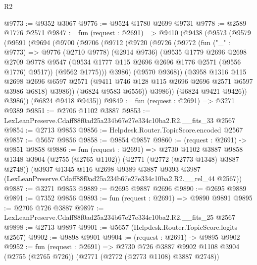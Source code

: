 \begin{lexlean}{R2}
\begin{coremodule}
@9773 := @9352 @3067
@9776 := @9524 @1780 @2699 @9731
@9778 := @2589 @1776 @2571
@9847 := fun (request : @2691) =>
  @9410
    (@9438
      (@9573
        (@9579
          (@9591
            (@9694
              (@9700
                (@9706
                  (@9712
                    (@9720
                      (@9726
                        (@9772
                          (fun ("_" : @9773) =>
                          @9776
                            (@2710 @9778)
                            (@2914 @9736)
                            (@9535
                              @1779
                              @2696
                              @2698
                              @2709
                              @9778
                              @9547
                              (@9534 @1777 @115 @2696 @2696 @1776 @2571 (@9556 @1776) @9517))
                            (@9562 @1775)))
                        @3986)
                      (@9570 @9368))
                    (@3958
                      @1316
                      @115
                      @2698
                      @2696
                      @6597
                      @2571
                      (@9411 @746 @128 @115 @2696 @2696 @2571 @6597 @3986 @6818)
                      @3986))
                  (@6824 @9583 @6556))
                @3986))
            (@6824 @9421 @9426))
          @3986))
      (@6824 @9418 @9435))
@9849 := fun (request : @2691) => @3271 @9389
@9851 := @2706 @1102 @3887
@9853 := LexLeanPreserve.Cdaff88f0ad25a234b67e27e334c10ba2.R2.__fits_33 @2567
@9854 := @2713 @9853
@9856 := Helpdesk.Router.TopicScore.encoded @2567
@9857 := @5657 @9856
@9858 := @9854 @9857
@9860 := (request : @2691) -> @9851 @9858
@9886 := fun (request : @2691) =>
  @2730
    @1102
    @3887
    @9858
    @1348
    @3904
    (@2755 (@2765 @1102))
    (@2771 (@2772 (@2773 @1348) @3887 @2748))
    (@3937
      @1345
      @116
      @2698
      @9389
      @3887
      @9393
      @3987
      (LexLeanPreserve.Cdaff88f0ad25a234b67e27e334c10ba2.R2.__rel_44 @2567))
@9887 := @3271 @9853
@9889 := @2695 @9887 @2696
@9890 := @2695 @9889
@9891 := @7352 @9856
@9893 := fun (request : @2691) => @9890 @9891
@9895 := @2706 @726 @3887
@9897 := LexLeanPreserve.Cdaff88f0ad25a234b67e27e334c10ba2.R2.__fits_25 @2567
@9898 := @2713 @9897
@9901 := @5657 (Helpdesk.Router.TopicScore.logits @2567)
@9902 := @9898 @9901
@9904 := (request : @2691) -> @9895 @9902
@9952 := fun (request : @2691) =>
  @2730
    @726
    @3887
    @9902
    @1108
    @3904
    (@2755 (@2765 @726))
    (@2771 (@2772 (@2773 @1108) @3887 @2748))

\end{coremodule}
\end{lexlean}
